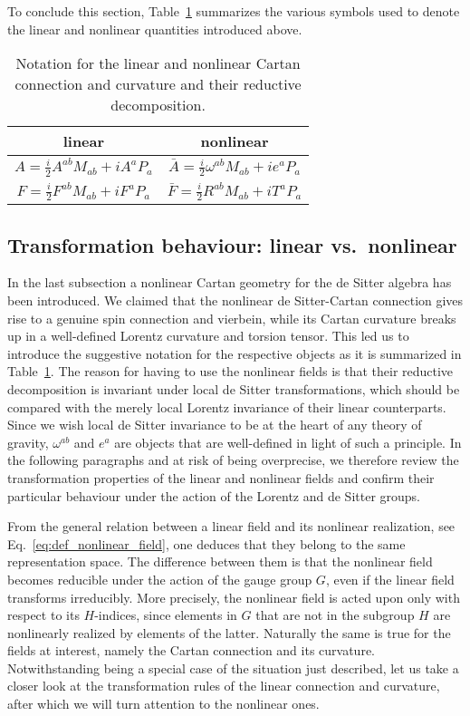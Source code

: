 \documentclass[11pt]{article}
\begin{document}
To conclude this section, Table~\ref{tbl:not_nonlin_cartan_geo} 
summarizes the various symbols used to denote the linear and 
nonlinear quantities introduced above.
\begin{table}[th]
	\caption{Notation for the linear and nonlinear Cartan 
		connection and curvature and their reductive 
		decomposition.}
	\label{tbl:not_nonlin_cartan_geo}
	\centering
	\renewcommand{\arraystretch}{2}
	\begin{tabular}{cc}
		linear	& nonlinear	\\
		\hline
		\hline
		$A = \tfrac{i}{2}A^{ab} M_{ab} + iA^a P_a$
			& $\bar{A} = \tfrac{i}{2}\omega^{ab} M_{ab} + ie^a P_a$
		\\
		\hline
		$F = \tfrac{i}{2}F^{ab} M_{ab} + iF^a P_a$
			& $\bar{F} = \tfrac{i}{2}R^{ab} M_{ab} + iT^a P_a$
	\end{tabular}
\end{table}

\subsection{Transformation behaviour: linear vs.~nonlinear}
\label{ssec:trafo_beh}

In the last subsection a nonlinear Cartan geometry for the de 
Sitter algebra has been introduced. We claimed that the nonlinear 
de Sitter-Cartan connection gives rise to a genuine spin 
connection and vierbein, while its Cartan curvature breaks up in 
a well-defined Lorentz curvature and torsion tensor. This led us 
to introduce the suggestive notation for the respective objects 
as it is summarized in Table~\ref{tbl:not_nonlin_cartan_geo}. The 
reason for having to use the nonlinear fields is that their 
reductive decomposition is invariant under local de Sitter 
transformations, which should be compared with the merely local 
Lorentz invariance of their linear counterparts. Since we wish 
local de Sitter invariance to be at the heart of any theory of 
gravity, $\omega^{ab}$ and $e^{a}$ are objects that are 
well-defined in light of such a principle. In the following 
paragraphs and at risk of being overprecise, we therefore review 
the transformation properties of the linear and nonlinear fields 
and confirm their particular behaviour under the action of the 
Lorentz and de Sitter groups.

From the general relation between a linear field and its 
nonlinear realization, see Eq.~\eqref{eq:def_nonlinear_field}, 
one deduces that they belong to the same representation space.  
The difference between them is that the nonlinear field becomes 
reducible under the action of the gauge group $G$, even if the 
linear field transforms irreducibly. More precisely, the 
nonlinear field is acted upon only with respect to its 
$H$-indices, since elements in $G$ that are not in the subgroup 
$H$ are nonlinearly realized by elements of the latter.  
Naturally the same is true for the fields at interest, namely the 
Cartan connection and its curvature. Notwithstanding being a 
special case of the situation just described, let us take a 
closer look at the transformation rules of the linear connection 
and curvature, after which we will turn attention to the 
nonlinear ones.
\end{document}
